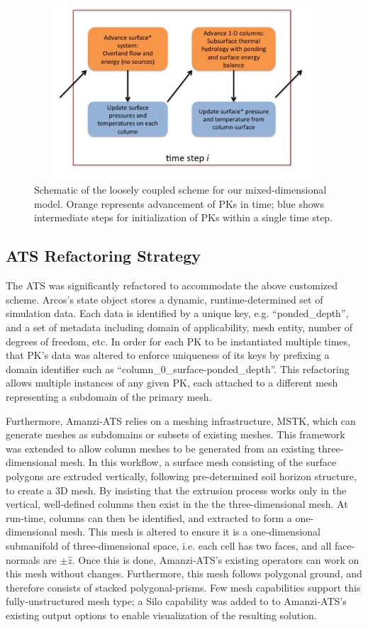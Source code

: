 \documentclass[review]{elsarticle}
\begin{document}

\begin{figure}[h]
\centering
\includegraphics[height = 6.5cm, width=11cm]{figures/Figure5-new.jpg}
\caption{Schematic of the loosely coupled scheme for our mixed-dimensional model. Orange represents advancement of PKs in time; blue shows intermediate steps for initialization of PKs within a single time step.}
\label{coupling-schematic}
\end{figure}


\subsection{ATS Refactoring Strategy}
The ATS was significantly refactored to accommodate the above customized scheme.
Arcos's state object stores a dynamic, runtime-determined set of simulation data.
Each data is identified by a unique key, e.g. ``ponded\_depth'', and a set of metadata including domain of applicability, mesh entity, number of degrees of freedom, etc.
In order for each PK to be instantiated multiple times, that PK's data was altered to enforce uniqueness of its keys by prefixing a domain identifier such as ``column\_0\_surface-ponded\_depth''.
This refactoring allows multiple instances of any given PK, each attached to a different mesh representing a subdomain of the primary mesh.

Furthermore, Amanzi-ATS relies on a meshing infrastructure, MSTK, \cite{garimella-2014-mstk}  which can generate meshes as subdomains or subsets of existing meshes.
This framework was extended to allow column meshes to be generated from an existing three-dimensional mesh.
In this workflow, a surface mesh consisting of the surface polygons are extruded vertically, following pre-determined soil horizon structure, to create a 3D mesh.
By insisting that the extrusion process works only in the vertical, well-defined columns then exist in the the three-dimensional mesh.
At run-time, columns can then be identified, and extracted to form a one-dimensional mesh.
This mesh is altered to ensure it is a one-dimensional submanifold of three-dimensional space, i.e. each cell has two faces, and all face-normals are $\pm \hat{z}$.
Once this is done, Amanzi-ATS's existing operators can work on this mesh without changes.
Furthermore, this mesh follows polygonal ground, and therefore consists of stacked polygonal-prisms.
Few mesh capabilities support this fully-unstructured mesh type; a Silo\cite{silo} capability was added to to Amanzi-ATS's existing output options to enable visualization of the resulting solution.
\end{document}
